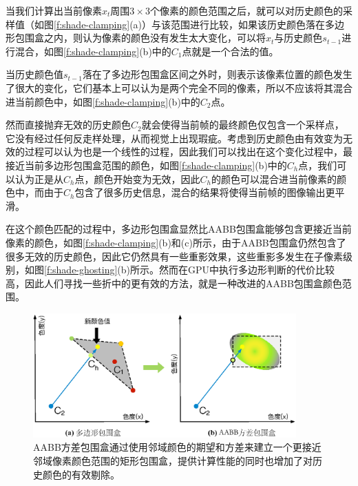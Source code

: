 当我们计算出当前像素$x_t$周围$3\times 3$个像素的颜色范围之后，就可以对历史颜色的采样值（如图\ref{f:shade-clamping}(a)）与该范围进行比较，如果该历史颜色落在多边形包围盒之内，则认为像素的颜色没有发生太大变化，可以将$x_t$与历史颜色$s_{t-1}$进行混合，如图\ref{f:shade-clamping}(b)中的$C_1$点就是一个合法的值。

当历史颜色值$s_{t-1}$落在了多边形包围盒区间之外时，则表示该像素位置的颜色发生了很大的变化，它们基本上可以认为是两个完全不同的像素，所以不应该将其混合进当前颜色中，如图\ref{f:shade-clamping}(b)中的$C_2$点。

然而直接抛弃无效的历史颜色$C_2$就会使得当前帧的最终颜色仅包含一个采样点，它没有经过任何反走样处理，从而视觉上出现瑕疵。考虑到历史颜色由有效变为无效的过程可以认为也是一个线性的过程，因此我们可以找出在这个变化过程中，最接近当前多边形包围盒范围的颜色，如图\ref{f:shade-clamping}(b)中的$C_h$点，我们可以认为正是从$C_h$点，颜色开始变为无效，因此$C_h$的颜色可以混合进当前像素的颜色中，而由于$C_h$包含了很多历史信息，混合的结果将使得当前帧的图像输出更平滑。

在这个颜色匹配的过程中，多边形包围盒显然比AABB包围盒能够包含更接近当前像素的颜色，如图\ref{f:shade-clamping}(b)和(c)所示，由于AABB包围盒仍然包含了很多无效的历史颜色，因此它仍然具有一些重影效果，这些重影多发生在子像素级别，如图\ref{f:shade-ghosting}(b)所示。然而在GPU中执行多边形判断的代价比较高，因此人们寻找一些折中的更有效的方法，\cite{a:AnExcursioninTemporalSupersampling}就是一种改进的AABB包围盒颜色范围。

\begin{figure}
\begin{center}
	\includegraphics[width=0.9\textwidth]{figures/shade/clamping-Variance}
\end{center}
	\caption{AABB方差包围盒通过使用邻域颜色的期望和方差来建立一个更接近邻域像素颜色范围的矩形包围盒，提供计算性能的同时也增加了对历史颜色的有效剔除。}
	\label{f:shade-clamping-Variance}
\end{figure}

